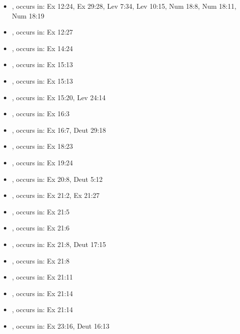 \documentclass[14pt]{article}
\begin{document}
\begin{itemize}
\item {}, occurs in: Ex 12:24, Ex 29:28, Lev 7:34, Lev 10:15, Num 18:8, Num 18:11, Num 18:19

\item {}, occurs in: Ex 12:27

\item {}, occurs in: Ex 14:24

\item {}, occurs in: Ex 15:13

\item {}, occurs in: Ex 15:13

\item {}, occurs in: Ex 15:20, Lev 24:14

\item {}, occurs in: Ex 16:3

\item {}, occurs in: Ex 16:7, Deut 29:18

\item {}, occurs in: Ex 18:23

\item {}, occurs in: Ex 19:24

\item {}, occurs in: Ex 20:8, Deut 5:12

\item {}, occurs in: Ex 21:2, Ex 21:27

\item {}, occurs in: Ex 21:5

\item {}, occurs in: Ex 21:6

\item {}, occurs in: Ex 21:8, Deut 17:15

\item {}, occurs in: Ex 21:8

\item {}, occurs in: Ex 21:11

\item {}, occurs in: Ex 21:14

\item {}, occurs in: Ex 21:14

\item {}, occurs in: Ex 23:16, Deut 16:13


\end{itemize}
\end{document}
